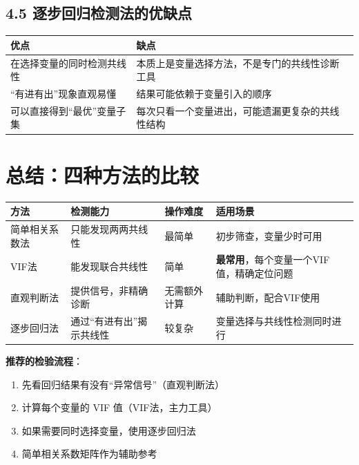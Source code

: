 \documentclass[12pt,a4paper]{ctexart}
\begin{document}
\subsection*{4.5 逐步回归检测法的优缺点}

\begin{center}
\begin{tabular}{p{5cm} p{5cm}}
\toprule
\textbf{优点} & \textbf{缺点} \\
\midrule
在选择变量的同时检测共线性 & 本质上是变量选择方法，不是专门的共线性诊断工具 \\
\addlinespace
“有进有出”现象直观易懂 & 结果可能依赖于变量引入的顺序 \\
\addlinespace
可以直接得到“最优”变量子集 & 每次只看一个变量进出，可能遗漏更复杂的共线性结构 \\
\bottomrule
\end{tabular}
\end{center}

\section*{总结：四种方法的比较}

\begin{center}
\begin{tabular}{p{2.5cm} p{3cm} p{2.5cm} p{3.5cm}}
\toprule
\textbf{方法} & \textbf{检测能力} & \textbf{操作难度} & \textbf{适用场景} \\
\midrule
简单相关系数法 & 只能发现两两共线性 & 最简单 & 初步筛查，变量少时可用 \\
VIF法 & 能发现联合共线性 & 简单 & \textbf{最常用}，每个变量一个VIF值，精确定位问题 \\
直观判断法 & 提供信号，非精确诊断 & 无需额外计算 & 辅助判断，配合VIF使用 \\
逐步回归法 & 通过“有进有出”揭示共线性 & 较复杂 & 变量选择与共线性检测同时进行 \\
\bottomrule
\end{tabular}
\end{center}

\textbf{推荐的检验流程}：
\begin{enumerate}
  \item 先看回归结果有没有“异常信号”（直观判断法）
  \item 计算每个变量的 VIF 值（VIF法，主力工具）
  \item 如果需要同时选择变量，使用逐步回归法
  \item 简单相关系数矩阵作为辅助参考
\end{enumerate}
\end{document}
